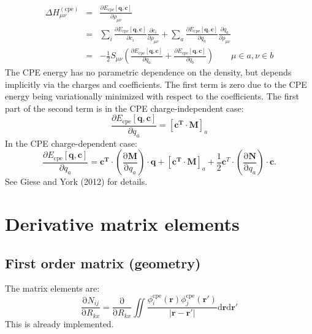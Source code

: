 \documentclass{article}
\numberwithin{equation}{section}
\begin{document}
\begin{eqnarray}
    \Delta H_{\mu\nu}^{\mathrm{(cpe)}} &=& \frac{\partial E_{\mathrm{cpe}}\left[\mathbf{q}, \mathbf{c}\right]}{\partial \rho_{\mu\nu}}\\
    &=& \sum_i \frac{\partial E_{\mathrm{cpe}}\left[\mathbf{q}, \mathbf{c}\right]}{\partial c_i} 
    \frac{\partial c_i}{\partial \rho_{\mu\nu}}
    + \sum_a \frac{\partial E_{\mathrm{cpe}}\left[\mathbf{q}, \mathbf{c}\right]}{\partial q_a} 
    \frac{\partial q_a}{\partial \rho_{\mu\nu}}\\
    &=& - \frac{1}{2} S_{\mu\nu} \left(
    \frac{\partial E_{\mathrm{cpe}}\left[\mathbf{q}, \mathbf{c}\right]}{\partial q_a} +
    \frac{\partial E_{\mathrm{cpe}}\left[\mathbf{q}, \mathbf{c}\right]}{\partial q_b}
\right) \qquad \mu \in a, \nu \in b
\end{eqnarray}
The CPE energy has no parametric dependence on the density, but depends implicitly via the charges and coefficients.
The first term is zero due to the CPE energy being variationally minimized with respect to the coefficients.
The first part of the second term is in the CPE charge-independent case:
\begin{equation}
    \frac{\partial E_{\mathrm{cpe}}\left[\mathbf{q}, \mathbf{c}\right]}{\partial q_a} = [\mathbf{c^T}  \cdot \mathbf{M}]_a
\end{equation}
In the CPE charge-dependent case:
\begin{equation}
    \frac{\partial E_{\mathrm{cpe}}\left[\mathbf{q}, \mathbf{c}\right]}{\partial q_a} = 
    \mathbf{c^T} \cdot \left( \frac{\mathrm{\partial}\mathbf{M}}{\mathrm{\partial}q_a}\right) \cdot \mathbf{q} 
    + [\mathbf{c^T}  \cdot \mathbf{M}]_a + \frac{1}{2}\mathbf{c}^T \cdot \left( \frac{\mathrm{\partial}\mathbf{N}}{\mathrm{\partial}q_a}\right) \cdot \mathbf{c}. 
\end{equation}
See Giese and York (2012) for details.\cite{gieseyork2012}

\section{Derivative matrix elements}

\subsection{First order matrix (geometry)}
The matrix elements are:
\begin{equation}
    \frac{\mathrm{\partial} N_{ij}}{\mathrm{\partial}R_{kx}} =
    \frac{\mathrm{\partial}}{\mathrm{\partial}R_{kx}}  \iint \frac{\phi_i^\mathrm{cpe}\left(\mathbf{r}\right)\phi_j^\mathrm{cpe}\left(\mathbf{r'}\right)}{\left| \mathbf{r} - \mathbf{r'}\right|} \mathrm{d}\mathbf{r}\mathrm{d}\mathbf{r'}
\end{equation}
This is already implemented.
\end{document}
